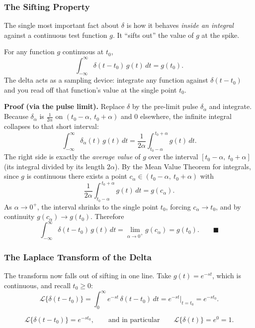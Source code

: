 \documentclass[11pt]{article}
\begin{document}
\subsubsection*{The Sifting Property}

The single most important fact about $\delta$ is how it behaves \emph{inside an integral} against a continuous test function $g$. It ``sifts out'' the value of $g$ at the spike.

\begin{formulabox}
For any function $g$ continuous at $t_0$,
\[ \int_{-\infty}^{\infty} \delta(t - t_0)\,g(t)\,dt = g(t_0). \]
The delta acts as a sampling device: integrate any function against $\delta(t-t_0)$ and you read off that function's value at the single point $t_0$.
\end{formulabox}

\textbf{Proof (via the pulse limit).} Replace $\delta$ by the pre-limit pulse $\delta_\alpha$ and integrate. Because $\delta_\alpha$ is $\tfrac{1}{2\alpha}$ on $(t_0 - \alpha,\ t_0 + \alpha)$ and $0$ elsewhere, the infinite integral collapses to that short interval:
\[ \int_{-\infty}^{\infty} \delta_\alpha(t)\,g(t)\,dt = \frac{1}{2\alpha}\int_{t_0 - \alpha}^{\,t_0 + \alpha} g(t)\,dt. \]
The right side is exactly the \emph{average value} of $g$ over the interval $[t_0 - \alpha,\ t_0 + \alpha]$ (its integral divided by its length $2\alpha$). By the Mean Value Theorem for integrals, since $g$ is continuous there exists a point $c_\alpha \in (t_0 - \alpha,\ t_0 + \alpha)$ with
\[ \frac{1}{2\alpha}\int_{t_0 - \alpha}^{\,t_0 + \alpha} g(t)\,dt = g(c_\alpha). \]
As $\alpha \to 0^{+}$, the interval shrinks to the single point $t_0$, forcing $c_\alpha \to t_0$, and by continuity $g(c_\alpha) \to g(t_0)$. Therefore
\[ \int_{-\infty}^{\infty} \delta(t - t_0)\,g(t)\,dt = \lim_{\alpha \to 0^{+}} g(c_\alpha) = g(t_0). \qquad\blacksquare \]

\subsubsection*{The Laplace Transform of the Delta}

The transform now falls out of sifting in one line. Take $g(t) = e^{-st}$, which is continuous, and recall $t_0 \ge 0$:
\[ \mathcal{L}\{\delta(t - t_0)\} = \int_{0}^{\infty} e^{-st}\,\delta(t - t_0)\,dt = e^{-st}\Big|_{t = t_0} = e^{-s t_0}. \]

\begin{formulabox}
\[ \mathcal{L}\{\delta(t - t_0)\} = e^{-s t_0}, \qquad\text{and in particular}\qquad \mathcal{L}\{\delta(t)\} = e^{0} = 1. \]
\end{formulabox}
\end{document}
